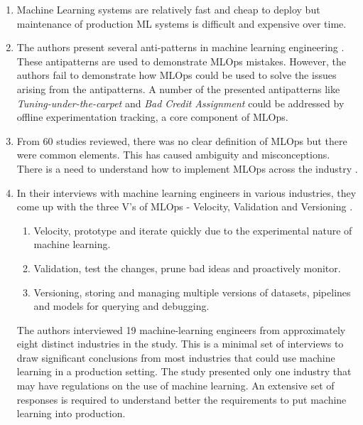 \documentclass[12pt, a4paper]{article}
\begin{document}
\begin{enumerate}

\item Machine Learning systems are relatively fast and cheap to deploy but maintenance of production ML systems is difficult and expensive over time.  \autocite{sculleyHiddenTechnicalDebt2015}

\item The authors present several anti-patterns in machine learning engineering \autocite{muralidharUsingAntiPatternsAvoid2021}. These antipatterns are used to demonstrate MLOps mistakes. However, the authors fail to demonstrate how MLOps could be used to solve the issues arising from the antipatterns. A number of the presented antipatterns like \textit{Tuning-under-the-carpet} and \textit{Bad Credit Assignment} could be addressed by offline experimentation tracking, a core component of MLOps.

\item From 60 studies reviewed, there was no clear definition of MLOps but there were common elements. This has caused ambiguity and misconceptions. There is a need to understand how to implement MLOps across the industry \autocite{mboweniSystematicReviewMachine2022}. 

\item In their interviews with machine learning engineers in various industries, they come up with the three V's of MLOps - Velocity, Validation and Versioning \autocite{shankarOperationalizingMachineLearning2022}. 
    \begin{enumerate}
        \item Velocity, prototype and iterate quickly due to the experimental nature of machine learning.
        \item Validation, test the changes, prune bad ideas and proactively monitor.
        \item Versioning, storing and managing multiple versions of datasets, pipelines and models for querying and debugging.
    \end{enumerate}
The authors interviewed 19 machine-learning engineers from approximately eight distinct industries in the study. This is a minimal set of interviews to draw significant conclusions from most industries that could use machine learning in a production setting. The study presented only one industry that may have regulations on the use of machine learning. An extensive set of responses is required to understand better the requirements to put machine learning into production.


\end{enumerate}
\end{document}

